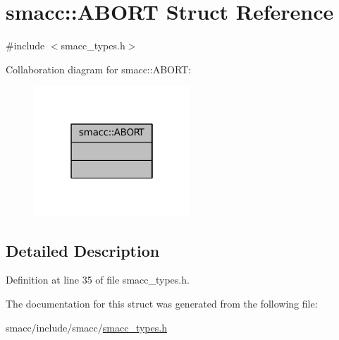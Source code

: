 \hypertarget{structsmacc_1_1ABORT}{}\section{smacc\+:\+:A\+B\+O\+RT Struct Reference}
\label{structsmacc_1_1ABORT}


{\ttfamily \#include $<$smacc\+\_\+types.\+h$>$}



Collaboration diagram for smacc\+:\+:A\+B\+O\+RT\+:
\nopagebreak
\begin{figure}[H]
\begin{center}
\leavevmode
\includegraphics[width=166pt]{structsmacc_1_1ABORT__coll__graph}
\end{center}
\end{figure}


\subsection{Detailed Description}


Definition at line 35 of file smacc\+\_\+types.\+h.



The documentation for this struct was generated from the following file\+:\begin{DoxyCompactItemize}
\item 
smacc/include/smacc/\hyperlink{smacc__types_8h}{smacc\+\_\+types.\+h}\end{DoxyCompactItemize}
